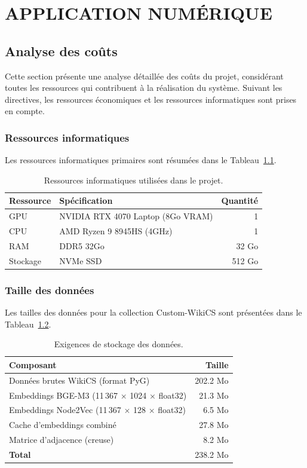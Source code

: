 \chapter{APPLICATION NUMÉRIQUE}
\thispagestyle{empty}

\section{Analyse des coûts}

Cette section présente une analyse détaillée des coûts du projet, considérant toutes les ressources qui contribuent à la réalisation du système. Suivant les directives, les ressources économiques et les ressources informatiques sont prises en compte.

\subsection{Ressources informatiques}

Les ressources informatiques primaires sont résumées dans le Tableau~\ref{tab:compute-resources}.

\begin{table}[htbp]
\centering
\caption{Ressources informatiques utilisées dans le projet.}
\label{tab:compute-resources}
\begin{tabular}{llr}
\toprule
\textbf{Ressource} & \textbf{Spécification} & \textbf{Quantité} \\
\midrule
GPU & NVIDIA RTX 4070 Laptop (8Go VRAM) & 1 \\
CPU & AMD Ryzen 9 8945HS (4GHz) & 1 \\
RAM & DDR5 32Go & 32 Go \\
Stockage & NVMe SSD & 512 Go \\
\bottomrule
\end{tabular}
\end{table}

\subsection{Taille des données}

Les tailles des données pour la collection Custom-WikiCS sont présentées dans le Tableau~\ref{tab:dataset-sizes}.

\begin{table}[htbp]
\centering
\caption{Exigences de stockage des données.}
\label{tab:dataset-sizes}
\begin{tabular}{lr}
\toprule
\textbf{Composant} & \textbf{Taille} \\
\midrule
Données brutes WikiCS (format PyG) & 202.2 Mo \\
Embeddings BGE-M3 (11\,367 $\times$ 1024 $\times$ float32) & 21.3 Mo \\
Embeddings Node2Vec (11\,367 $\times$ 128 $\times$ float32) & 6.5 Mo \\
Cache d'embeddings combiné & 27.8 Mo \\
Matrice d'adjacence (creuse) & 8.2 Mo \\
\textbf{Total} & \multicolumn{1}{r}{238.2 Mo} \\
\bottomrule
\end{tabular}
\end{table}

